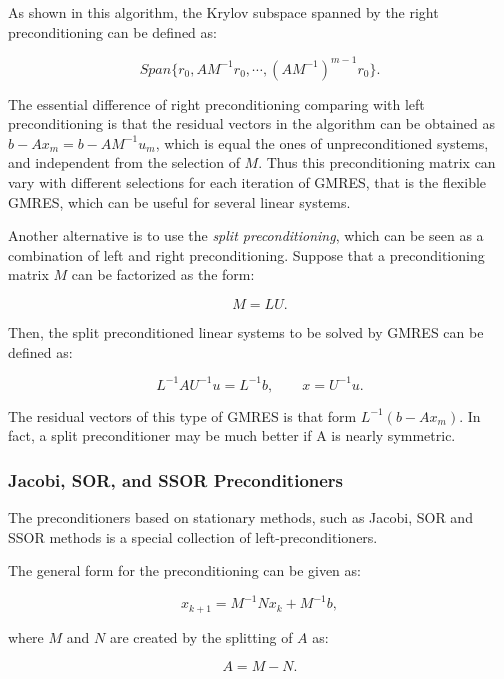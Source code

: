 {As shown in this algorithm, the Krylov subspace spanned by the right preconditioning can be defined as:

\begin{equation}
Span\{r_0, AM^{-1}r_0, \cdots, (AM^{-1})^{m-1}r_0\}.
\end{equation}

The essential difference of right preconditioning comparing with left preconditioning is that the residual vectors in the algorithm can be obtained as $b-Ax_m=b-AM^{-1}u_m$, which is equal the ones of unpreconditioned systems, and independent from the selection of $M$. Thus this preconditioning matrix can vary with different selections for each iteration of GMRES, that is the flexible GMRES, which can be useful for several linear systems.

Another alternative is to use the \textit{split preconditioning}, which can be seen as a combination of left and right preconditioning. Suppose that a preconditioning matrix $M$ can be factorized as the form:

\begin{equation}
M=LU.
\end{equation}

Then, the split preconditioned linear systems to be solved by GMRES can be defined as:

\begin{equation}
L^{-1}AU^{-1}u=L^{-1}b, \qquad x= U^{-1}u.
\end{equation}

The residual vectors of this type of GMRES is that form $L^{-1}(b-Ax_m)$. In fact, a split preconditioner may be much better if A is nearly symmetric. 

\subsubsection{Jacobi, SOR, and SSOR Preconditioners}

The preconditioners based on stationary methods, such as Jacobi, SOR and SSOR methods is a special collection of left-preconditioners.

The general form for the preconditioning can be given as:

\begin{equation}
x_{k+1} = M^{-1}Nx_k+M^{-1}b,
\end{equation}

where $M$ and $N$ are created by the splitting of $A$ as:

\begin{equation}
A=M-N.
\end{equation}

}
